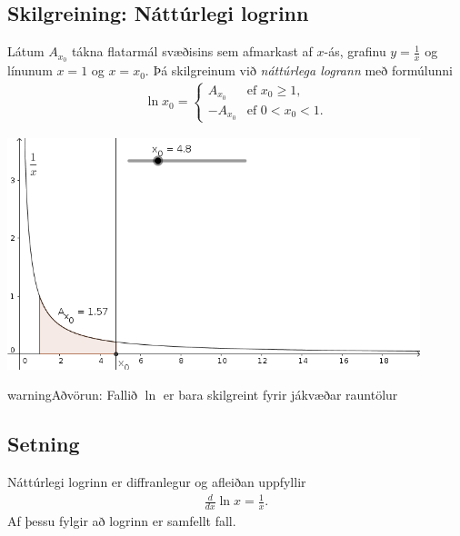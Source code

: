 \documentclass[b5paper,11pt,icelandic]{sphinxmanual}
\begin{document}
\subsection{Skilgreining: Náttúrlegi logrinn}
\label{kafli04:index-0}\label{kafli04:skilgreining-natturlegi-logrinn}
Látum \(A_{x_0}\) tákna flatarmál svæðisins sem afmarkast af
\(x\)-ás, grafinu \(y=\frac{1}{x}\) og línunum \(x=1\) og
\(x=x_0\). Þá skilgreinum við \textit{náttúrlega logrann} með formúlunni
\begin{equation*}
\begin{split}\ln x_0 =\left\{\begin{array}{ll}
A_{x_0} & \mbox{ef }x_0 \geq 1,\\
-A_{x_0} & \mbox{ef }0<x_0<1.
\end{array}
\right.\end{split}
\end{equation*}

\begin{center}
\includegraphics[width=12cm,keepaspectratio=true]{01_ln.png}
\end{center}


\begin{notice}{warning}{Aðvörun:}
Fallið \(\ln\) er bara skilgreint fyrir jákvæðar rauntölur
\end{notice}


\subsection{Setning}
\label{kafli04:setning}
Náttúrlegi logrinn er diffranlegur og afleiðan uppfyllir
\begin{equation*}
\begin{split}\frac{d}{dx}\ln x=\frac{1}{x}.\end{split}
\end{equation*}
Af þessu fylgir að logrinn er samfellt fall.
\end{document}
